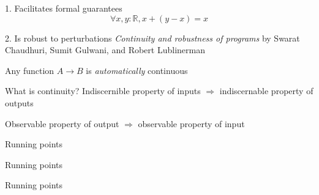 \documentclass[14pt]{beamer}
\newcommand{\R}{\mathbb{R}}
\begin{document}
\begin{frame}{1. Facilitates formal guarantees}
\[
\forall x, y : \R, x + (y - x) = x
\]
\end{frame}

\begin{frame}{2. Is robust to perturbations}
\emph{Continuity and robustness of programs} by Swarat Chaudhuri, Sumit Gulwani, and Robert Lublinerman

Any function $A \to B$ is \emph{automatically} continuous
\end{frame}

\begin{frame}{What is continuity?}
Indiscernible property of inputs $\Rightarrow$ indiscernable property of outputs

Observable property of output $\Rightarrow$ observable property of input
\end{frame}



\begin{frame}{Running points}
\begin{center}
\end{center}
\end{frame}

\begin{frame}{Running points}
\begin{center}
\end{center}
\end{frame}

\begin{frame}{Running points}
\begin{center}
\end{center}
\end{frame}
\end{document}
